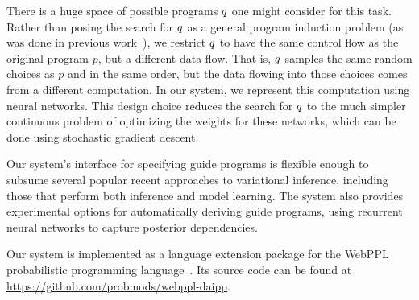 There is a huge space of possible programs $q$ one might consider for this task. Rather than posing the search for $q$ as a general program induction problem (as was done in previous work~\cite{GuidePrograms}), we restrict $q$ to have the same control flow as the original program $p$, but a different data flow.
That is, $q$ samples the same random choices as $p$ and in the same order, but the data flowing into those choices comes from a different computation.
In our system, we represent this computation using neural networks.
This design choice reduces the search for $q$ to the much simpler continuous problem of optimizing the weights for these networks, which can be done using stochastic gradient descent.

Our system's interface for specifying guide programs is flexible enough to subsume several popular recent approaches to variational inference, including those that perform both inference and model learning. The system also provides experimental options for automatically deriving guide programs, using recurrent neural networks to capture posterior dependencies.~

Our system is implemented as a language extension package for the WebPPL probabilistic programming language~\cite{WebPPL}. Its source code can be found at \url{https://github.com/probmods/webppl-daipp}.
